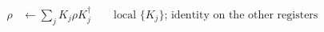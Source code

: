 \documentclass[12pt]{article}
\begin{document}
\fontsize{22}{28}\selectfont
\begin{align*}
\rho &\leftarrow \sum_j K_j\rho K_j^\dagger
      \qquad\text{local $\{K_j\}$; identity on the other registers}
\end{align*}
\end{document}
